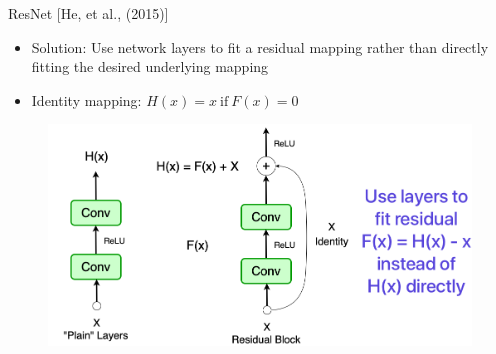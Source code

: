 \documentclass[serif, aspectratio=169]{beamer}
\begin{document}
\begin{frame}{ResNet [He, et al., (2015)]}
	
	\begin{itemize}
		\item Solution: Use network layers to fit a residual mapping rather than directly fitting the desired underlying mapping
		\item Identity mapping: $H(x) = x \  \text{if} \ F(x) = 0$
	\end{itemize}
	
	\begin{figure}[htpb]
		\begin{center}
			\hspace{2cm} \includegraphics[keepaspectratio, scale=0.24]{pic/resBlock2}
		\end{center}
	\end{figure}

\end{frame}
\end{document}
